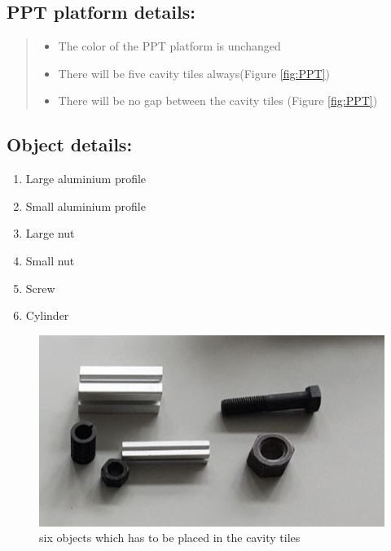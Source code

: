 \documentclass{article}
\begin{document}
\subsection{PPT platform details: }

\begin{quote}
\begin{itemize}
\item The color of the PPT platform is unchanged 
\item There will be five cavity tiles always(Figure \ref{fig:PPT}) 
\item There will be no gap between the cavity tiles (Figure \ref{fig:PPT}) 

\end{itemize}
\end{quote}




\subsection{Object details:}

\begin{enumerate}
\item Large aluminium profile
\item Small aluminium profile
\item Large nut
\item Small nut
\item Screw
\item Cylinder 
\end{enumerate}

\begin{figure}[h!]
\begin{center}
\includegraphics[scale=0.5]{images/AllParts.jpg}
\end{center}
\caption{six objects which has to be placed in the cavity tiles}
\end{figure}
\end{document}
